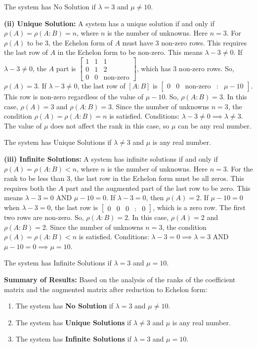 \documentclass{article}
\begin{document}
The system has No Solution if $\lambda = 3$ and $\mu \neq 10$.

\textbf{(ii) Unique Solution:}
A system has a unique solution if and only if $\rho(A) = \rho(A:B) = n$, where $n$ is the number of unknowns. Here $n=3$.
For $\rho(A)$ to be 3, the Echelon form of $A$ must have 3 non-zero rows. This requires the last row of $A$ in the Echelon form to be non-zero. This means $\lambda - 3 \neq 0$.
If $\lambda - 3 \neq 0$, the $A$ part is $\begin{bmatrix} 1 & 1 & 1 \\ 0 & 1 & 2 \\ 0 & 0 & \text{non-zero} \end{bmatrix}$, which has 3 non-zero rows. So, $\rho(A) = 3$.
If $\lambda - 3 \neq 0$, the last row of $[A:B]$ is $\begin{bmatrix} 0 & 0 & \text{non-zero} & : & \mu - 10 \end{bmatrix}$. This row is non-zero regardless of the value of $\mu - 10$. So, $\rho(A:B) = 3$.
In this case, $\rho(A) = 3$ and $\rho(A:B) = 3$. Since the number of unknowns $n=3$, the condition $\rho(A) = \rho(A:B) = n$ is satisfied.
Conditions: $\lambda - 3 \neq 0 \implies \lambda \neq 3$. The value of $\mu$ does not affect the rank in this case, so $\mu$ can be any real number.

The system has Unique Solutions if $\lambda \neq 3$ and $\mu$ is any real number.

\textbf{(iii) Infinite Solutions:}
A system has infinite solutions if and only if $\rho(A) = \rho(A:B) < n$, where $n$ is the number of unknowns. Here $n=3$.
For the rank to be less than 3, the last row in the Echelon form must be all zeros. This requires both the $A$ part and the augmented part of the last row to be zero.
This means $\lambda - 3 = 0$ AND $\mu - 10 = 0$.
If $\lambda - 3 = 0$, then $\rho(A) = 2$.
If $\mu - 10 = 0$ when $\lambda - 3 = 0$, the last row is $\begin{bmatrix} 0 & 0 & 0 & : & 0 \end{bmatrix}$, which is a zero row. The first two rows are non-zero. So, $\rho(A:B) = 2$.
In this case, $\rho(A) = 2$ and $\rho(A:B) = 2$. Since the number of unknowns $n=3$, the condition $\rho(A) = \rho(A:B) < n$ is satisfied.
Conditions: $\lambda - 3 = 0 \implies \lambda = 3$ AND $\mu - 10 = 0 \implies \mu = 10$.

The system has Infinite Solutions if $\lambda = 3$ and $\mu = 10$.

\textbf{Summary of Results:}
Based on the analysis of the ranks of the coefficient matrix and the augmented matrix after reduction to Echelon form:
\begin{enumerate}
    \item The system has \textbf{No Solution} if $\lambda = 3$ and $\mu \neq 10$.
    \item The system has \textbf{Unique Solutions} if $\lambda \neq 3$ and $\mu$ is any real number.
    \item The system has \textbf{Infinite Solutions} if $\lambda = 3$ and $\mu = 10$.
\end{enumerate}
\end{document}
